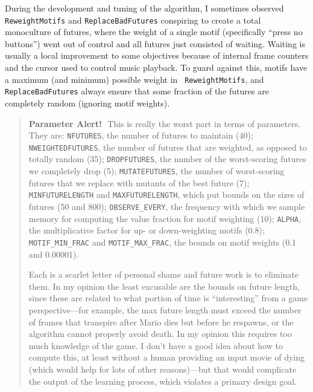 \documentclass[twocolumn]{article}
\newcommand\parameteralert[1]{
  \begin{quotation}
  {\bf Parameter Alert!}\,\, #1
  \end{quotation}
}
\begin{document}
During the development and tuning of the algorithm, I sometimes
observed {\tt ReweightMotifs} and {\tt ReplaceBadFutures} conspiring
to create a total monoculture of futures, where the weight of a single
motif (specifically ``press no buttons'') went out of control and all
futures just consisted of waiting. Waiting is usually a local
improvement to some objectives because of internal frame counters and
the cursor used to control music playback. To guard against this,
motifs have a maximum (and minimum) possible weight in {\tt
  ReweightMotifs}, and {\tt ReplaceBadFutures} always ensure that
some fraction of the futures are completely random (ignoring motif
weights).

\parameteralert{
  This is really the worst part in terms of parameters. They are: 
  {\tt NFUTURES}, the number of futures to maintain (40);
  {\tt NWEIGHTEDFUTURES}, the number of futures that are weighted,
  as opposed to totally random (35);
  {\tt DROPFUTURES}, the number of the worst-scoring futures we
  completely drop (5);
  {\tt MUTATEFUTURES}, the number of worst-scoring futures that
  we replace with mutants of the best future (7);
  {\tt MINFUTURELENGTH} and {\tt MAXFUTURELENGTH}, which put bounds
  on the sizes of futures (50 and 800);
  {\tt OBSERVE\_EVERY}, the frequency with which we sample memory
  for computing the value fraction for motif weighting (10);
  {\tt ALPHA}, the multiplicative factor for up- or down-weighting
  motifs (0.8);
  {\tt MOTIF\_MIN\_FRAC} and {\tt MOTIF\_MAX\_FRAC}, the bounds
  on motif weights (0.1 and 0.00001).
  
  Each is a scarlet letter of personal shame and future work is to
  eliminate them. In my opinion the least excusable are the bounds on
  future length, since these are related to what portion of time is
  ``interesting'' from a game perspective---for example, the max
  future length must exceed the number of frames that transpire after
  Mario dies but before he respawns, or the algorithm cannot properly
  avoid death. In my opinion this requires too much knowledge of the
  game. I don't have a good idea about how to compute this, at least
  without a human providing an input movie of dying (which would
  help for lots of other reasons)---but that would complicate the
  output of the learning process, which violates a primary design goal.
  
}
\end{document}
